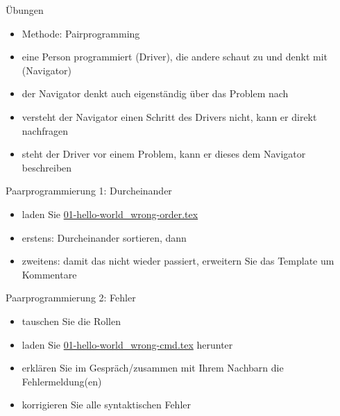 \begin{frame}{Übungen}

\begin{itemize}
\itemsep1pt\parskip0pt
\item
  Methode: Pairprogramming
\item
  eine Person programmiert (Driver), die andere schaut zu und denkt mit
  (Navigator)
\item
  der Navigator denkt auch eigenständig über das Problem nach
\item
  versteht der Navigator einen Schritt des Drivers nicht, kann er direkt
  nachfragen
\item
  steht der Driver vor einem Problem, kann er dieses dem Navigator
  beschreiben
\end{itemize}

\end{frame}

\begin{frame}{Paarprogrammierung 1: Durcheinander}

\begin{itemize}
\itemsep1pt\parskip0pt
\item
  laden Sie
  \url{01-hello-world_wrong-order.tex}
\item
  erstens: Durcheinander sortieren, dann
\item
  zweitens: damit das nicht wieder passiert, erweitern Sie das Template
  um Kommentare
\end{itemize}

\end{frame}

\begin{frame}{Paarprogrammierung 2: Fehler}

\begin{itemize}
\itemsep1pt\parskip0pt
\item
  tauschen Sie die Rollen
\item
  laden Sie
  \url{01-hello-world_wrong-cmd.tex}
  herunter
\item
  erklären Sie im Gespräch/zusammen mit Ihrem Nachbarn die
  Fehlermeldung(en)
\item
  korrigieren Sie alle syntaktischen Fehler
\end{itemize}

\end{frame}
